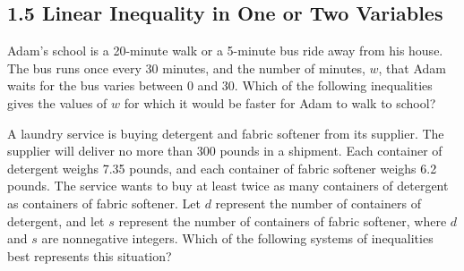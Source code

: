 \subsection*{1.5 Linear Inequality in One or Two Variables}
\vspace{0.5em}

\setcounter{questionnum}{0}


\noindent\markforreview

\vspace{1em}

Adam’s school is a 20-minute walk or a 5-minute bus ride away from his house. The bus runs once every 30 minutes, and the number of minutes, \( w \), that Adam waits for the bus varies between 0 and 30. Which of the following inequalities gives the values of \( w \) for which it would be faster for Adam to walk to school?

\vspace{0.75em}


\newpage

\noindent\markforreview

\vspace{1em}

A laundry service is buying detergent and fabric softener from its supplier. The supplier will deliver no more than 300 pounds in a shipment. Each container of detergent weighs 7.35 pounds, and each container of fabric softener weighs 6.2 pounds. The service wants to buy at least twice as many containers of detergent as containers of fabric softener. Let \( d \) represent the number of containers of detergent, and let \( s \) represent the number of containers of fabric softener, where \( d \) and \( s \) are nonnegative integers. Which of the following systems of inequalities best represents this situation?

\vspace{0.75em}


